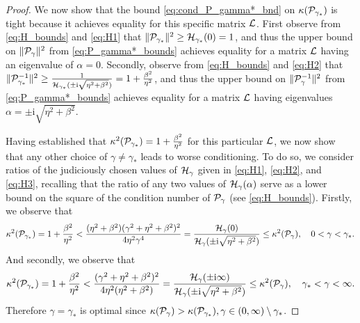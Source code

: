 \documentclass[a4paper,10pt]{article}
\begin{document}
\begin{proof}
We now show that the bound \eqref{eq:cond_P_gamma*_bnd} on $\kappa({\cal P}_{\gamma_*})$ is tight because it achieves equality for this specific matrix ${\cal L}$. First observe from \eqref{eq:H_bounds} and \eqref{eq:H1} that $\Vert {\cal P}_{\gamma_*} \Vert^2 \geq {\cal H}_{\gamma_*}(0) = 1$, and thus the upper bound on $\Vert {\cal P}_{\gamma} \Vert^2$ from \eqref{eq:P_gamma*_bounds} achieves equality for a matrix ${\cal L}$ having an eigenvalue of $\alpha = 0$. Secondly, observe from \eqref{eq:H_bounds} and \eqref{eq:H2} that $\Vert {\cal P}_{\gamma_*}^{-1} \Vert^2 \geq \tfrac{1}{{\cal H}_{\gamma_*}(\pm \mathrm{i} \sqrt{\eta^2 + \beta^2})}= 1 + \tfrac{\beta^2}{\eta^2}$, and thus the upper bound on $\Vert {\cal P}_{\gamma}^{-1} \Vert^2$ from \eqref{eq:P_gamma*_bounds} achieves equality for a matrix ${\cal L}$ having eigenvalues $\alpha = \pm \mathrm{i} \sqrt{\eta^2 + \beta^2}$. 

Having established that $\kappa^2({\cal P}_{\gamma_*}) = 1 + \tfrac{\beta^2}{\eta^2}$ for this particular ${\cal L}$, we now show that any other choice of $\gamma \neq \gamma_*$ leads to worse conditioning. To do so, we consider ratios of the judiciously chosen values of ${\cal H}_{\gamma}$ given in \eqref{eq:H1}, \eqref{eq:H2}, and \eqref{eq:H3}, recalling that the ratio of any two values of ${\cal H}_{\gamma}(\alpha)$ serve as a lower bound on the square of the condition number of ${\cal P}_{\gamma}$ (see \eqref{eq:H_bounds}). Firstly, we observe that
\begin{align*}
\kappa^2({\cal P}_{\gamma_*})
=
1 + \frac{\beta^2}{\eta^2}
<
\frac{(\eta^2 + \beta^2) (\gamma^2 + \eta^2 + \beta^2)^2}{4 \eta^2 \gamma^4}
=
\frac{{\cal H}_{\gamma}(0)}{{\cal H}_{\gamma}(\pm \mathrm{i} \sqrt{\eta^2 + \beta^2})}
\leq
\kappa^2({\cal P}_{\gamma}),
\quad 0 < \gamma < \gamma_*.
\end{align*}
And secondly, we observe that
\begin{align*}
\kappa^2({\cal P}_{\gamma_*})
=
1 + \frac{\beta^2}{\eta^2}
< 
\frac{(\gamma^2 + \eta^2 + \beta^2)^2}{4 \eta^2 (\eta^2 + \beta^2)}
=
\frac{{\cal H}_{\gamma}(\pm \mathrm{i} \infty)}{{\cal H}_{\gamma}(\pm \mathrm{i} \sqrt{\eta^2 + \beta^2})}
\leq
\kappa^2({\cal P}_{\gamma}), 
\quad \gamma_* < \gamma < \infty.
\end{align*}
Therefore $\gamma = \gamma_*$ is optimal since $\kappa({\cal P}_{\gamma}) > \kappa({\cal P}_{\gamma_*}), \gamma \in (0, \infty) \setminus \gamma_*$.
\end{proof}
\end{document}
